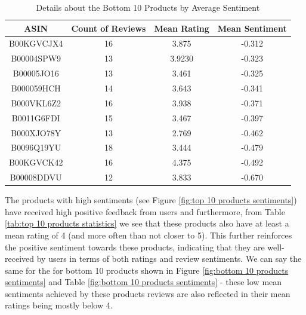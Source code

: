 \begin{table}[h]
  \centering
  \begin{tabular}{cccc}
      \hline
      \textbf{ASIN} & \textbf{Count of Reviews} & \textbf{Mean Rating} & \textbf{Mean Sentiment} \\
      \hline
      B00KGVCJX4 & 16 & 3.875 & -0.312 \\
      B00004SPW9 & 13 & 3.9230 & -0.323 \\
      B00005JO16 & 13 & 3.461 & -0.325 \\
      B000059HCH & 14 & 3.643 & -0.341 \\
      B000VKL6Z2 & 16 & 3.938 & -0.371 \\
      B0011G6FDI & 15 & 3.467 & -0.397 \\
      B000XJO78Y & 13 & 2.769 & -0.462 \\
      B0096Q19YU & 18 & 3.444 & -0.479 \\
      B00KGVCK42 & 16 & 4.375 & -0.492 \\
      B00008DDVU & 12 & 3.833 & -0.670 \\
      \hline
  \end{tabular}
  \caption{Details about the Bottom 10 Products by Average Sentiment}
  \label{tab:bottom 10 products statistics}
\end{table}

The products with high sentiments (see Figure \ref{fig:top 10 products sentiments}) have received high positive feedback from users and furthermore, from Table \ref{tab:top 10 products statistics} we see that these products also have at least a mean rating of 4 (and more often than not closer to 5). This further reinforces the positive sentiment towards these products, indicating that they are well-received by users in terms of both ratings and review sentiments. We can say the same for the for bottom 10 products shown in Figure \ref{fig:bottom 10 products sentiments}  and Table \ref{fig:bottom 10 products sentiments} - these low mean sentiments achieved by these products reviews are also reflected in their mean ratings being mostly below 4.

